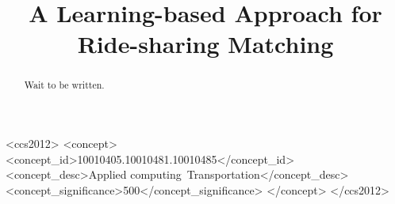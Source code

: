 \documentclass[sigconf]{acmart}
\newcommand{\tcr}[1]{{\textcolor{red}{#1}}}
\begin{document}
\title{A Learning-based Approach for Ride-sharing Matching}






\begin{abstract}
Wait to be written.
\end{abstract}

\begin{CCSXML}
<ccs2012>
   <concept>
       <concept_id>10010405.10010481.10010485</concept_id>
       <concept_desc>Applied computing~Transportation</concept_desc>
       <concept_significance>500</concept_significance>
       </concept>
 </ccs2012>
\end{CCSXML}
\end{document}
